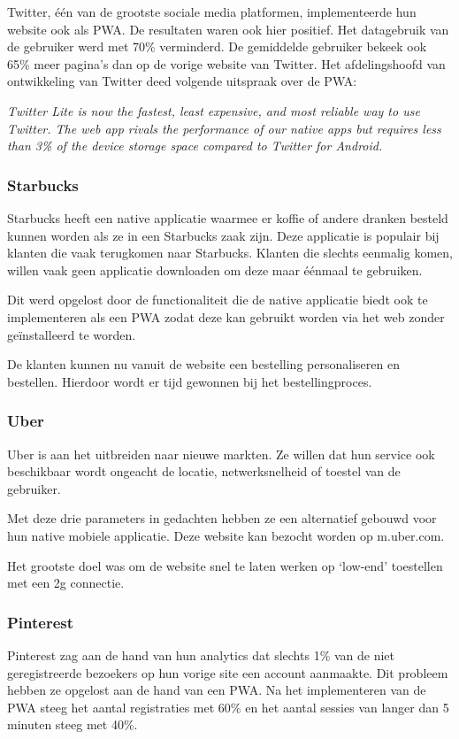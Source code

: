 Twitter, één van de grootste sociale media platformen, implementeerde hun website ook als PWA. De resultaten waren ook hier positief. Het datagebruik van de gebruiker werd met 70\% verminderd. De gemiddelde gebruiker bekeek ook 65\% meer pagina’s dan op de vorige website van Twitter.
Het afdelingshoofd van ontwikkeling van Twitter deed volgende uitspraak over de PWA:

\textit{Twitter Lite is now the fastest, least expensive, and most reliable way to use Twitter. The web app rivals the performance of our native apps but requires less than 3\% of the device storage space compared to Twitter for Android.}

\autocite{Developers2020a}
\autocite{Love2018}

\subsubsection{Starbucks}

Starbucks heeft een native applicatie waarmee er koffie of andere dranken besteld kunnen worden als ze in een Starbucks zaak zijn. Deze applicatie is populair bij klanten die vaak terugkomen naar Starbucks. Klanten die slechts eenmalig komen, willen vaak geen applicatie downloaden om deze maar éénmaal te gebruiken.

Dit werd opgelost door de functionaliteit die de native applicatie biedt ook te implementeren als een PWA zodat deze kan gebruikt worden via het web zonder geïnstalleerd te worden.

De klanten kunnen nu vanuit de website een bestelling personaliseren en bestellen. Hierdoor wordt er tijd gewonnen bij het bestellingproces.

\autocite{Formidable2020}
\autocite{Kawatka2020}

\subsubsection{Uber}

Uber is aan het uitbreiden naar nieuwe markten. Ze willen dat hun service ook beschikbaar wordt ongeacht de locatie, netwerksnelheid of toestel van de gebruiker.

Met deze drie parameters in gedachten hebben ze een alternatief gebouwd voor hun native mobiele applicatie. Deze website kan bezocht worden op m.uber.com.

Het grootste doel was om de website snel te laten werken op ‘low-end’ toestellen met een 2g connectie. 

\autocite{Croll2017}

\subsubsection{Pinterest}

Pinterest zag aan de hand van hun analytics dat slechts 1\% van de niet geregistreerde bezoekers op hun vorige site een account aanmaakte. Dit probleem hebben ze opgelost aan de hand van een PWA.
Na het implementeren van de PWA steeg het aantal registraties met 60\% en het aantal sessies van langer dan 5 minuten steeg met 40\%.

\autocite{Osmani2019b}



